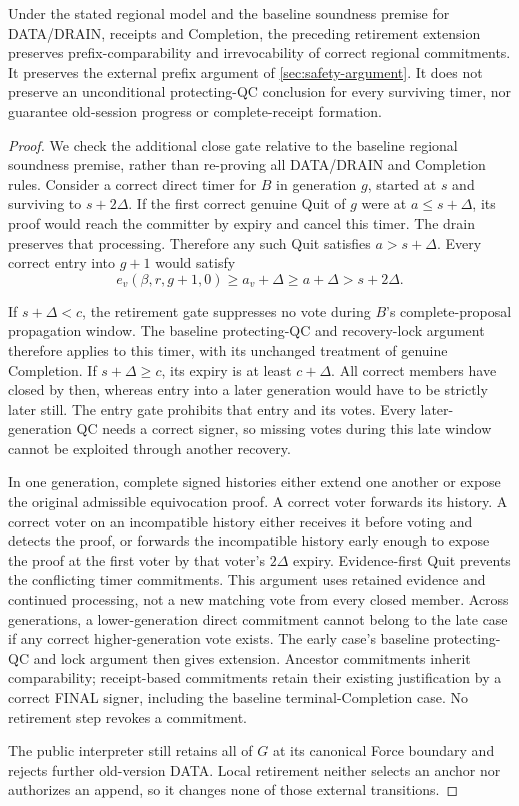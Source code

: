 \begin{proposition}
\label{prop:retirement-safety}
Under the stated regional model and the baseline soundness premise
for DATA/DRAIN, receipts and Completion, the preceding retirement
extension preserves prefix-comparability and irrevocability of correct
regional commitments. It preserves the external prefix argument of
\cref{sec:safety-argument}. It does not preserve an unconditional
protecting-QC conclusion for every surviving timer, nor guarantee
old-session progress or complete-receipt formation.
\end{proposition}
\begin{proof}
We check the additional close gate relative to the baseline regional
soundness premise, rather than re-proving all DATA/DRAIN and Completion
rules. Consider a correct direct timer for $B$ in generation $g$,
started at $s$ and surviving to $s+2\Delta$. If the first correct
genuine Quit of $g$ were at $a\le s+\Delta$, its proof would reach
the committer by expiry and cancel this timer. The drain preserves
that processing. Therefore any such Quit satisfies $a>s+\Delta$.
Every correct entry into $g+1$ would satisfy
\[
 e_v(\beta,r,g+1,0)\ge a_v+\Delta
 \ge a+\Delta>s+2\Delta.
\]

If $s+\Delta<c$, the retirement gate suppresses no vote during
$B$'s complete-proposal propagation window. The baseline
protecting-QC and recovery-lock argument therefore applies to this
timer, with its unchanged treatment of genuine Completion.
If $s+\Delta\ge c$, its expiry is at least $c+\Delta$.
All correct members have closed by then, whereas entry into a later
generation would have to be strictly later still. The entry gate
prohibits that entry and its votes. Every later-generation QC needs
a correct signer, so missing votes during this late window cannot
be exploited through another recovery.

In one generation, complete signed histories either extend one
another or expose the original admissible equivocation proof.
A correct voter forwards its history. A correct voter on an
incompatible history either receives it before voting and detects
the proof, or forwards the incompatible history early enough to
expose the proof at the first voter by that voter's $2\Delta$
expiry. Evidence-first Quit prevents the conflicting timer
commitments. This argument uses retained evidence and continued
processing, not a new matching vote from every closed member.
Across generations, a lower-generation direct commitment cannot
belong to the late case if any correct higher-generation vote
exists. The early case's baseline protecting-QC and lock argument
then gives extension. Ancestor commitments inherit comparability;
receipt-based commitments retain their existing justification by
a correct FINAL signer, including the baseline terminal-Completion
case. No retirement step revokes a commitment.

The public interpreter still retains all of $G$ at its canonical
Force boundary and rejects further old-version DATA. Local retirement
neither selects an anchor nor authorizes an append, so it changes none
of those external transitions.
\end{proof}

